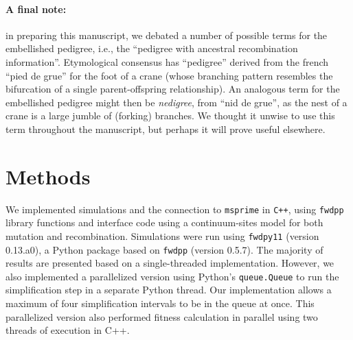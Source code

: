 \documentclass{article}
\newcommand{\fwdpp}{\texttt{fwdpp}}
\newcommand{\fwdpy}{\texttt{fwdpy11}}
\newcommand{\justc}{\texttt{C}}
\newcommand{\cpp}{\texttt{C++}}
\newcommand{\msprime}{\texttt{msprime}}
\begin{document}

\paragraph{A final note:}
in preparing this manuscript,
we debated a number of possible terms for the embellished pedigree,
i.e., the ``pedigree with ancestral recombination information''.
Etymological consensus \citep{liberman2014little} has
``pedigree'' derived from the french ``pied de grue'' for the foot of a crane
(whose branching pattern resembles the bifurcation of a single parent-offspring relationship).
An analogous term for the embellished pedigree might then be \emph{nedigree},
from ``nid de grue'',
as the nest of a crane is a large jumble of (forking) branches.
We thought it unwise to use this term throughout the manuscript,
but perhaps it will prove useful elsewhere.


\section*{Methods}

We implemented simulations and the connection to \msprime{} in \cpp{}, using \fwdpp{} library functions and
interface code using a continuum-sites model for both mutation
and recombination. Simulations were run using \fwdpy{} (version 0.13.a0), a Python package based
on \fwdpp{} (version 0.5.7).  The majority of results are presented based on a single-threaded implementation.  However,
we also implemented a parallelized version using Python's \texttt{queue.Queue} to run the simplification step in a separate Python
thread. Our implementation allows a maximum of four simplification intervals to be in the queue at once. This
parallelized version also performed fitness calculation in parallel using two threads of execution in C++.
\end{document}
